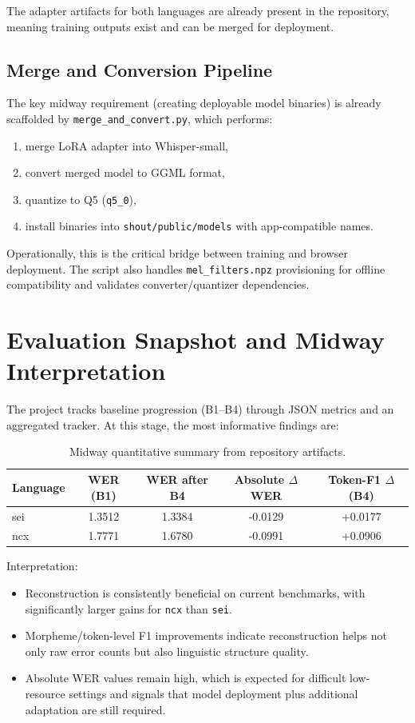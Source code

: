 \documentclass[11pt]{article}
\begin{document}
The adapter artifacts for both languages are already present in the repository, meaning training outputs exist and can be merged for deployment.

\subsection{Merge and Conversion Pipeline}
The key midway requirement (creating deployable model binaries) is already scaffolded by \texttt{merge\_and\_convert.py}, which performs:
\begin{enumerate}
    \item merge LoRA adapter into Whisper-small,
    \item convert merged model to GGML format,
    \item quantize to Q5 (\texttt{q5\_0}),
    \item install binaries into \texttt{shout/public/models} with app-compatible names.
\end{enumerate}

Operationally, this is the critical bridge between training and browser deployment. The script also handles \texttt{mel\_filters.npz} provisioning for offline compatibility and validates converter/quantizer dependencies.

\section{Evaluation Snapshot and Midway Interpretation}
The project tracks baseline progression (B1--B4) through JSON metrics and an aggregated tracker. At this stage, the most informative findings are:

\begin{table}[t]
\centering
\caption{Midway quantitative summary from repository artifacts.}
\begin{tabular}{@{}lcccc@{}}
\toprule
\textbf{Language} & \textbf{WER (B1)} & \textbf{WER after B4} & \textbf{Absolute $\Delta$WER} & \textbf{Token-F1 $\Delta$ (B4)} \\
\midrule
sei & 1.3512 & 1.3384 & -0.0129 & +0.0177 \\
ncx & 1.7771 & 1.6780 & -0.0991 & +0.0906 \\
\bottomrule
\end{tabular}
\end{table}

\noindent Interpretation:
\begin{itemize}
    \item Reconstruction is consistently beneficial on current benchmarks, with significantly larger gains for \texttt{ncx} than \texttt{sei}.
    \item Morpheme/token-level F1 improvements indicate reconstruction helps not only raw error counts but also linguistic structure quality.
    \item Absolute WER values remain high, which is expected for difficult low-resource settings and signals that model deployment plus additional adaptation are still required.
\end{itemize}
\end{document}
